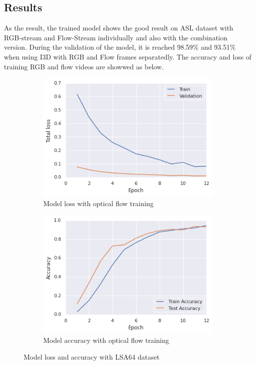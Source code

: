 \documentclass[a4paper, 12pt]{article}
\begin{document}
\subsection{Results}
As the result, the trained model shows the good result on ASL dataset with RGB-stream and Flow-Stream individually and also with the combination version. During the validation of the model, it is reached 98.59\% and 93.51\% when using I3D with RGB and Flow frames separatedly. The accuracy and loss of training RGB and flow videos are showwed as below.

\begin{figure}[H]
    \centering
    \begin{subfigure}[b]{0.4\textwidth}
        \includegraphics[width=\textwidth]{Result_ASL_flow_Loss.png}
        \caption{Model loss with optical flow training    }
    \end{subfigure}
    \hfill
    \begin{subfigure}[b]{0.4\textwidth}
        \includegraphics[width=\textwidth]{Result_on_ASL_Flow_Dataset.png}
        \caption{Model accuracy with optical flow training}
    \end{subfigure}
    \caption{Model loss and accuracy with LSA64 dataset}
    \label{Model training LSA64 dataset, flow-stream}
\end{figure}
\end{document}
